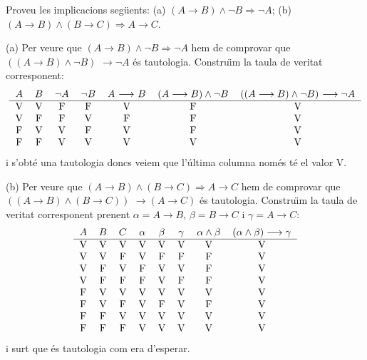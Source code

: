 \begin{exer}
Proveu les implicacions seg\"{u}ents: (a) $(A\longrightarrow B)\wedge\lnot
B\Longrightarrow\lnot A$; (b) $\left(  A\longrightarrow B\right)
\wedge\left(  B\longrightarrow C\right)  \Longrightarrow A\longrightarrow C$.
\end{exer}

\begin{solucio}
(a) Per veure que $(A\longrightarrow B)\wedge\lnot B\Longrightarrow\lnot A$
hem de comprovar que $\left(  (A\longrightarrow B)\wedge\lnot B\right)  $
$\longrightarrow\lnot A$ \'{e}s tautologia. Constru\"{\i}m la taula de veritat
corresponent:%
\[%
\begin{tabular}
[c]{ccccccc}%
$A$ & $B$ & $\lnot A$ & $\lnot B$ & $A$ $\longrightarrow$ $B$ &
$(A\longrightarrow B)\wedge\lnot B$ & $\left(  (A\longrightarrow B)\wedge\lnot
B\right)  $ $\longrightarrow\lnot A$\\\hline
V & V & F & F & V & F & V\\
V & F & F & V & F & F & V\\
F & V & V & F & V & F & V\\
F & F & V & V & V & V & V
\end{tabular}
\]
i s'obt\'{e} una tautologia doncs veiem que l'\'{u}ltima columna nom\'{e}s
t\'{e} el valor V.

(b) Per veure que $\left(  A\longrightarrow B\right)  \wedge\left(
B\longrightarrow C\right)  \Longrightarrow A\longrightarrow C$ hem de
comprovar que $\left(  \left(  A\longrightarrow B\right)  \wedge\left(
B\longrightarrow C\right)  \right)  $ $\longrightarrow\left(  A\longrightarrow
C\right)  $ \'{e}s tautologia. Constru\"{\i}m la taula de veritat corresponent
prenent $\alpha=A\longrightarrow B$, $\beta=B\longrightarrow C $ i
$\gamma=A\longrightarrow C$:%
\[%
\begin{tabular}
[c]{cccccccc}%
$A$ & $B$ & $C$ & $\alpha$ & $\beta$ & $\gamma$ & $\alpha\wedge\beta$ &
$\left(  \alpha\wedge\beta\right)  \longrightarrow\gamma$\\\hline
V & V & V & V & V & V & V & V\\
V & V & F & V & F & F & F & V\\
V & F & V & F & V & V & F & V\\
V & F & F & F & V & F & F & V\\
F & V & V & V & V & V & V & V\\
F & V & F & V & F & V & F & V\\
F & F & V & V & V & V & V & V\\
F & F & F & V & V & V & V & V
\end{tabular}
\]
i surt que \'{e}s tautologia com era d'esperar.
\end{solucio}

